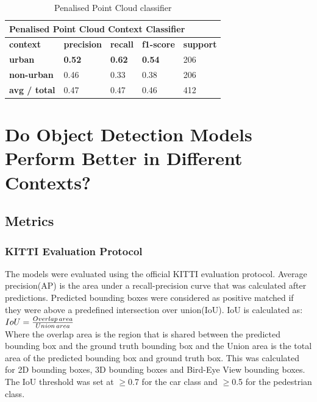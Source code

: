 \begin{table}[h] %
	\centering
	\begin{tabular}{|l|l|l|l|l|}
		\hline
		\multicolumn{5}{|l|}{\textbf{Penalised Point Cloud Context Classifier}}                            \\ \hline
		\textbf{context}            & \textbf{precision} & \textbf{recall} & \textbf{f1-score} & \textbf{support} \\ \hline
		\textbf{urban}       & \textbf{0.52}      & \textbf{0.62}   & \textbf{0.54}     & 206              \\ \hline
		\textbf{non-urban}   & 0.46               & 0.33            & 0.38              & 206              \\ \hline
		\textbf{avg / total} & 0.47               & 0.47            & 0.46              & 412              \\ \hline
	\end{tabular}
	\caption{Penalised Point Cloud classifier}
	\label{tab:penalisedpcl}
\end{table}

\section{Do Object Detection Models Perform Better in Different Contexts?}
\subsection*{Metrics}
\subsubsection*{KITTI Evaluation Protocol}
The models were evaluated using the official KITTI evaluation protocol. Average precision(AP) is the area under a recall-precision curve that was calculated after predictions. Predicted bounding boxes were considered as positive matched if they were above a predefined intersection over union(IoU). 
IoU is calculated as: \\ 
\begin{math}
\centering
IoU = \frac{Overlap\, area}{Union\, area}
\end{math} \\ 
Where the overlap area is the region that is shared between the predicted bounding box and the ground truth bounding box and the Union area is the total area of the predicted bounding box and ground truth box.
This was calculated for 2D bounding boxes, 3D bounding boxes and Bird-Eye View bounding boxes. The IoU threshold was set at  $\geq$0.7 for the car class and $\geq$0.5 for the pedestrian class. 

